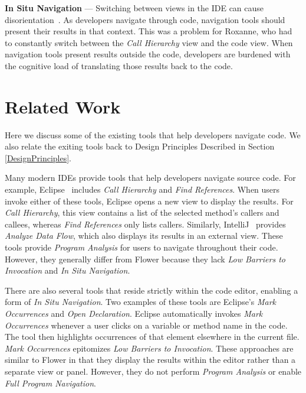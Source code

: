 \documentclass[conference]{IEEEtran}
\begin{document}
\vspace{1em} 
\noindent\textbf{In Situ Navigation}  ---
Switching between views in the IDE can cause disorientation~\cite{deAlwis2006disorient}. 
As developers navigate through code, navigation tools should present their results in that context. 
This was a problem for Roxanne, who had to constantly switch between the \emph{Call Hierarchy} view and the code view.
When navigation tools present results outside the code, developers are burdened with the cognitive load of translating those results back to the code.

\section{Related Work}
Here we discuss some of the existing tools that help developers navigate code. We also relate the exiting tools back to Design Principles Described in Section \ref{DesignPrinciples}.

Many modern IDEs provide tools that help developers navigate source code. 
For example, Eclipse~\cite{Eclipse} includes \emph{Call Hierarchy} and \emph{Find References}. 
When users invoke either of these tools, Eclipse opens a new view to display the results.
For \emph{Call Hierarchy}, this view contains a list of the selected method's callers and callees, whereas \emph{Find References} only lists callers.
Similarly, IntelliJ~\cite{IntelliJ} provides \emph{Analyze Data Flow}, which also displays its results in an external view.
These tools provide \textit{Program Analysis} for users to navigate throughout their code. 
However, they generally differ from Flower because they lack \textit{Low Barriers to Invocation} and \textit{In Situ Navigation}.

There are also several tools that reside strictly within the code editor, enabling a form of \textit{In Situ Navigation}.
Two examples of these tools are Eclipse's \emph{Mark Occurrences} and \emph{Open Declaration}. 
Eclipse automatically invokes \emph{Mark Occurrences} whenever a user clicks on a variable or method name in the code.
The tool then highlights occurrences of that element elsewhere in the current file.
\emph{Mark Occurrences} epitomizes \textit{Low Barriers to Invocation}.
These approaches are similar to Flower in that they display the results within the editor rather than a separate view or panel.
However, they do not perform \textit{Program Analysis} or enable \textit{Full Program Navigation}.
\end{document}
